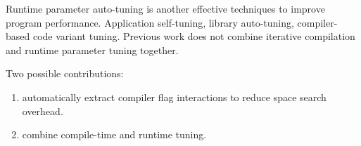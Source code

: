Runtime parameter auto-tuning is another effective techniques to improve program performance. Application self-tuning, library auto-tuning, compiler-based code variant tuning. Previous work does not combine iterative compilation and runtime parameter tuning together.

Two possible contributions:
\begin{enumerate}
\item automatically extract compiler flag interactions to reduce space search overhead.
\item combine compile-time and runtime tuning.
\end{enumerate}
\fi

